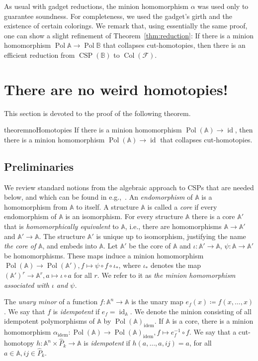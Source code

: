 \documentclass[oneside]{amsart}
\DeclareMathOperator{\col}{Col}
\newcommand{\str}[1]{\mathbb{#1}}
\newcommand{\cat}[1]{\mathcal{#1}}
\newcommand{\pol}{\operatorname{Pol}}
\newcommand{\CSP}{\operatorname{CSP}}
\newcommand{\idem}{\mathrm{idem}}
\DeclareMathOperator{\id}{id}
\begin{document}
As usual with gadget reductions, the minion homomorphism $\alpha$ was used only to guarantee soundness. For completeness, we used the gadget's girth and the existence of certain colorings.
We remark that, using essentially the same proof, one can show a slight refinement of Theorem~\ref{thm:reduction}: If there is a minion homomorphism $\pol\str A\to\pol\str B$ that collapses cut-homotopies, then there is an efficient reduction from $\CSP(\str B)$ to $\col(\cat F)$.





\section{There are no weird homotopies!}
\label{sec:therearenoweirdhomotopies}
This section is devoted to the proof of the following theorem.

\begin{restatable}{theorem}{noHomotopies}
\label{thm:noHomotopies}
    If there is a minion homomorphism $\pol(\str A) \to \id$, then there is a minion homomorphism $\pol(\str A)\to \id$ that collapses cut-homotopies.
\end{restatable}

\subsection{Preliminaries}
We review standard notions from the algebraic approach to CSPs that are needed below, and which can be found in e.g.,~\cite{PolymorphismsAndHowToUseThem}.
An \emph{endomorphism} of $\str A$ is a homomorphism from $\str A$ to itself.
A structure $\str A$ is called a \emph{core} if every endomorphism of $\str A$ is an isomorphism.
For every structure $\str A$ there is a core $\str A'$ that is \emph{homomorphically equivalent} to $\str A$, i.e., there are homomorphisms $\str A \to \str A'$ and $\str A' \to \str A$.
The structure $\str A'$ is unique up to isomorphism, justifying the name \emph{the core of} $\str A$, and embeds into $\str A$.
Let $\str A'$ be the core of $\str A$ and $\iota \colon \str A' \to \str A$, $\psi\colon \str A \to \str A'$ be homomorphisms. These maps induce a minion homomorphism $\pol(\str A) \to \pol(\str A'), f \mapsto \psi \circ f\circ \iota_*$, where $\iota_*$ denotes the map $(\str A')^r \to \str A^r, a \mapsto \iota\circ a$ for all $r$. We refer to it as \emph{the minion homomorphism associated with $\iota$ and $\psi$.}

The \emph{unary minor} of a function $f\colon \str A^n \to \str A$ is the unary map $e_f(x) \coloneq f(x,\ldots,x)$.
We say that $f$ is \emph{idempotent} if $e_f= \id_\str A$.
We denote the minion consisting of all idempotent polymorphisms of $\str A$ by $\pol(\str A)_\idem$.
If $\str A$ is a core, there is a minion homomorphism $\alpha_\idem\colon\pol(\str A) \to \pol(\str A)_\idem, f\mapsto e_f^{-1}\circ f$.
We say that a cut-homotopy $h\colon \str A^n \times \hat P_k \to \str A$ is \emph{idempotent} if $h(a,\dots,a,ij) = a$, for all $a \in \str A, ij\in \hat P_k$.
\end{document}
